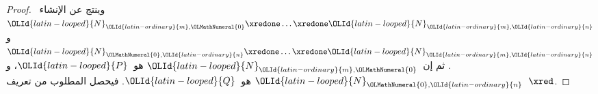 \documentclass[../../../include/open-logic-section]{subfiles}
\begin{document}
\begin{proof}
  وينتج عن الإنشاء~$\OLId{latin-looped}{N}_{\OLId{latin-ordinary}{m},\OLMathNumeral{0}} \xredone \dots \xredone \OLId{latin-looped}{N}_{\OLId{latin-ordinary}{m},\OLId{latin-ordinary}{n}}$ و$\OLId{latin-looped}{N}_{\OLMathNumeral{0},\OLId{latin-ordinary}{n}} \xredone \dots \xredone \OLId{latin-looped}{N}_{\OLId{latin-ordinary}{m},\OLId{latin-ordinary}{n}}$.
  ثم إن~$\OLId{latin-looped}{N}_{\OLId{latin-ordinary}{m},\OLMathNumeral{0}}$ هو~$\OLId{latin-looped}{P}$، و$\OLId{latin-looped}{N}_{\OLMathNumeral{0},\OLId{latin-ordinary}{n}}$ هو~$\OLId{latin-looped}{Q}$.
  فيحصل المطلوب من تعريف~$\xred$.
\end{proof}
\end{document}
